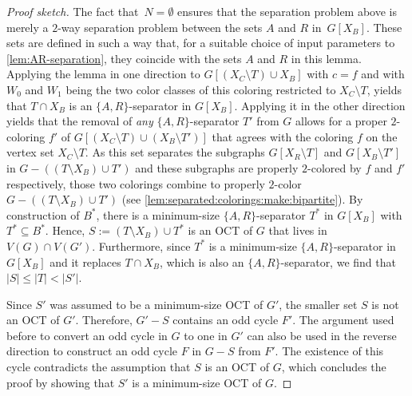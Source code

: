\begin{proof}[Proof sketch]
	The fact that~$N = \emptyset$ ensures that the separation problem above is merely a $2$-way separation problem between the sets $A$ and $R$ in~$G[X_B]$. These sets are defined in such a way that, for a suitable choice of input parameters to \cref{lem:AR-separation}, they coincide with the sets $A$ and $R$ in this lemma. Applying the lemma in one direction to $G[(X_C \setminus T) \cup X_B]$ with $c = f$ and with $W_0$ and $W_1$ being the two color classes of this coloring restricted to $X_C \setminus T$, yields that $T \cap X_B$ is an $\{A, R\}$-separator in $G[X_B]$. 
	Applying it in the other direction yields that the removal of \emph{any} $\{A, R\}$-separator $T'$ from $G$ allows for a proper $2$-coloring $f'$ of $G[(X_C \setminus T) \cup (X_B \setminus T')]$ that agrees with the coloring $f$ on the vertex set $X_C \setminus T$. As this set separates the subgraphs $G[X_R \setminus T]$ and $G[X_B \setminus T']$ in $G - ((T \setminus X_B) \cup T')$ and these subgraphs are properly $2$-colored by $f$ and $f'$ respectively, those two colorings combine to properly $2$-color $G - ((T \setminus X_B) \cup T')$ (see \cref{lem:separated:colorings:make:bipartite}). By construction of $B^\ast$, there is a minimum-size $\{A, R\}$-separator $T^\ast$ in $G[X_B]$ with~$T^\ast \subseteq B^\ast$. Hence, $S := (T \setminus X_B) \cup T^\ast$ is an OCT of $G$ that lives in $V(G) \cap V(G')$. Furthermore, since $T^\ast$ is a minimum-size $\{A, R\}$-separator in $G[X_B]$ and it replaces $T \cap X_B$, which is also an $\{A, R\}$-separator, we find that $|S| \leq |T| < |S'|$.
	
	Since $S'$ was assumed to be a minimum-size OCT of $G'$, the smaller set $S$ is not an OCT of $G'$. Therefore, $G' - S$ contains an odd cycle $F'$. The argument used before to convert an odd cycle in $G$ to one in $G'$ can also be used in the reverse direction to construct an odd cycle $F$ in $G - S$ from $F'$. The existence of this cycle contradicts the assumption that $S$ is an OCT of $G$, which concludes the proof by showing that $S'$ is a minimum-size OCT of $G$.
\end{proof}

